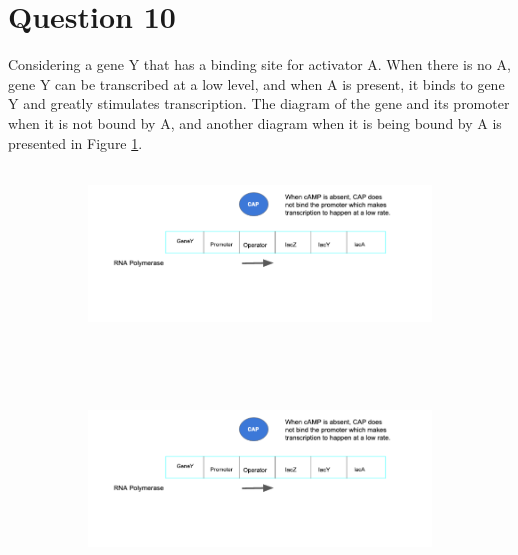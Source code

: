 \documentclass[12pt,a4paper]{article}
\begin{document}
\section*{Question 10}
Considering a gene Y that has a binding site for activator A.  When there is no A,  gene Y
can be transcribed at a low level,  and when A is present,  it binds to gene Y and greatly
stimulates transcription.  The diagram of the gene and its promoter when it is not bound by A,
and another diagram when it is being bound by A is presented in Figure \ref{fig:10}.
\begin{figure}[th!]
    \centering
    \begin{subfigure}[t]{0.5\textwidth}
        \centering
        \includegraphics[height=1.8in]{./gaphics/q_10a.png}
    \end{subfigure}%
    ~ 
    \begin{subfigure}[t]{0.5\textwidth}
        \centering
        \includegraphics[height=1.8in]{./gaphics/q_10a.png}
    \end{subfigure}
    \caption{}
    \label{fig:10}
\end{figure}
\end{document}
